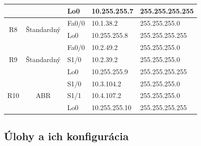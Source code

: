 \documentclass[12pt,twoside,a4paper]{article}
\begin{document}
\begin{table}[!htb]
\begin{tabular}{|c|c|l|l|l|}
                     &                                         & Lo0                                     & 10.255.255.7                            & 255.255.255.255                     \\ \hline
\multirow{2}{*}{R8}  & \multirow{2}{*}{Štandardný}             & Fa0/0                                   & 10.1.38.2                               & 255.255.255.0                       \\ \cline{3-5} 
                     &                                         & Lo0                                     & 10.255.255.8                            & 255.255.255.255                     \\ \hline
\multirow{3}{*}{R9}  & \multirow{3}{*}{Štandardný}             & Fa0/0                                   & 10.2.49.2                               & 255.255.255.0                       \\ \cline{3-5} 
                     &                                         & S1/0                                    & 10.2.39.2                               & 255.255.255.0                       \\ \cline{3-5} 
                     &                                         & Lo0                                     & 10.255.255.9                            & 255.255.255.255                     \\ \hline
\multirow{3}{*}{R10} & \multirow{3}{*}{ABR}                    & S1/0                                    & 10.3.104.2                              & 255.255.255.0                       \\ \cline{3-5} 
                     &                                         & S1/1                                    & 10.4.107.2                              & 255.255.255.0                       \\ \cline{3-5} 
                     &                                         & Lo0                                     & 10.255.255.10                           & 255.255.255.255                     \\ \hline
\end{tabular}
\end{table}


\newpage


\subsection*{Úlohy a ich konfigurácia}
\end{document}
